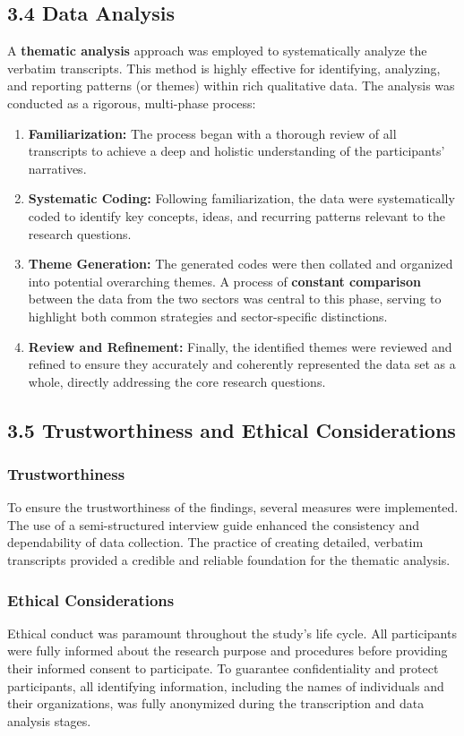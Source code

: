 \subsection*{3.4 Data Analysis}

A \textbf{thematic analysis} approach was employed to systematically analyze the verbatim transcripts. This method is highly effective for identifying, analyzing, and reporting patterns (or themes) within rich qualitative data. The analysis was conducted as a rigorous, multi-phase process:
\begin{enumerate}
	\item \textbf{Familiarization:} The process began with a thorough review of all transcripts to achieve a deep and holistic understanding of the participants' narratives.
	\item \textbf{Systematic Coding:} Following familiarization, the data were systematically coded to identify key concepts, ideas, and recurring patterns relevant to the research questions.
	\item \textbf{Theme Generation:} The generated codes were then collated and organized into potential overarching themes. A process of \textbf{constant comparison} between the data from the two sectors was central to this phase, serving to highlight both common strategies and sector-specific distinctions.
	\item \textbf{Review and Refinement:} Finally, the identified themes were reviewed and refined to ensure they accurately and coherently represented the data set as a whole, directly addressing the core research questions.
\end{enumerate}

\subsection*{3.5 Trustworthiness and Ethical Considerations}

\subsubsection*{Trustworthiness}
To ensure the trustworthiness of the findings, several measures were implemented. The use of a semi-structured interview guide enhanced the consistency and dependability of data collection. The practice of creating detailed, verbatim transcripts provided a credible and reliable foundation for the thematic analysis.

\subsubsection*{Ethical Considerations}
Ethical conduct was paramount throughout the study's life cycle. All participants were fully informed about the research purpose and procedures before providing their informed consent to participate. To guarantee confidentiality and protect participants, all identifying information, including the names of individuals and their organizations, was fully anonymized during the transcription and data analysis stages.
